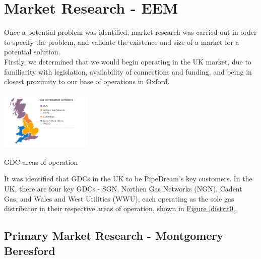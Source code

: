 \documentclass[11pt]{article}		%
\newcommand{\supercite}[1]{\textsuperscript{\cite{#1}}}		%
\newcommand{\figref}[1]{\hyperref[#1]{Figure \ref*{#1}}}    %
\begin{document}
    \section{Market Research - EEM}
    
        Once a potential problem was identified, market research was carried out in order to specify the problem, and validate the existence and size of a market for a potential solution. 
        \\
        \hspace*{3ex}Firstly, we determined that we would begin operating in the UK market, due to familiarity with legislation, availability of connections and funding, and being in closest proximity to our base of operations in Oxford. 
        \begin{floatingfigure}[r]{0.4\textwidth}
		    \centering
	    	\includegraphics[width=0.32\textwidth]{distribution}
		    \caption{GDC areas of operation\supercite{Gas_Distribution_Industry}}
    	    \label{distrit0}
    	\end{floatingfigure}
        \hspace*{3ex}It was identified that GDCs in the UK to be PipeDream's key customers. In the UK, there are four key GDCs - SGN, Northen Gas Networks (NGN), Cadent Gas, and Wales and West Utilities (WWU), each operating as the sole gas distributor in their respective areas of operation, shown in \figref{distrit0}. 

        \subsection[Primary Market Research]{Primary Market Research - Montgomery Beresford} \label{primaryresearch}
              \begin{floatingfigure}[r]{0pt} \end{floatingfigure}	 
            
\end{document}
